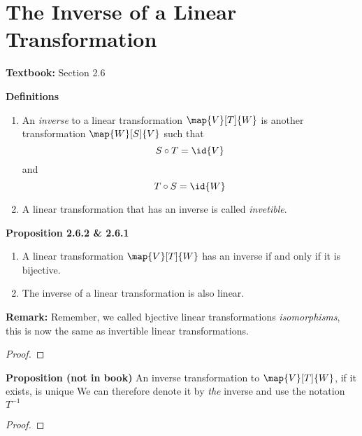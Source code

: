 \documentclass[letterpaper, 10pt]{article}
\begin{document}
\newpage
\section*{The Inverse of a Linear Transformation}%
\textbf{Textbook:} Section 2.6
\lb


\lb
\textbf{Definitions} 
\lb
\begin{enumerate}
    \item 
        An \emph{inverse }to a linear transformation $\map{V}[T]{W}$ is another transformation
        $\map{W}[S]{V}$ such that
        \[ S \circ T = \id{V} \]
        and
        \[ T \circ S = \id{W} \]
    \item
        A linear transformation that has an inverse is called \emph{invetible}.
\end{enumerate}



\lb
\textbf{Proposition 2.6.2 \& 2.6.1}
\begin{enumerate}
    \item
        A linear transformation $\map{V}[T]{W}$ has an inverse if and only if it is bijective.
    \item
        The inverse of a linear transformation is also linear.
\end{enumerate}
\textbf{Remark:} Remember, we called bjective linear transformations \emph{isomorphisms}, this
is now the same as invertible linear transformations.
\begin{proof}
\end{proof}


\newpage




\lb
\textbf{Proposition (not in book)}
\lb
An inverse transformation to $\map{V}[T]{W}$, if it exists, is unique
\pr
We can therefore denote it by \emph{the} inverse and use the notation $T^{-1}$
\begin{proof}
\end{proof}

\vspace{200pt}
\end{document}
